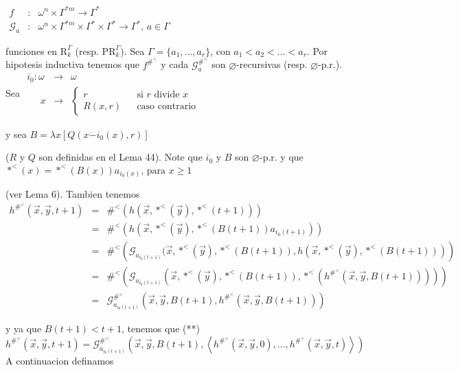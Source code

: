 \(\displaystyle \begin{array}{rcl} f & :& \omega ^{n}\times \Gamma ^{\ast m}\rightarrow \Gamma ^{\ast } \\ \mathcal{G}_{a} & :& \omega ^{n}\times \Gamma ^{\ast m}\times \Gamma ^{\ast }\times \Gamma ^{\ast }\rightarrow \Gamma ^{\ast }\text{, }a\in \Gamma \end{array} \)

funciones en \(\mathrm{R}_{k}^{\Gamma }\) (resp. \(\mathrm{PR}_{k}^{\Gamma }\)). Sea \(\Gamma =\{a_{1},...,a_{r}\}\), con \(a_{1}< a_{2}< ...< a_{r}\). Por hipotesis inductiva tenemos que \(f^{\#^{< }}\) y cada \(\mathcal{G} _{a}^{\#^{< }} \) son \(\varnothing \)-recursivas (resp. \(\varnothing \)-p.r.). Sea
\(\displaystyle \begin{array}{lll} i_{0}:\omega & \rightarrow & \omega \\ \;\;\;\;\;x & \rightarrow & \left\{ \begin{array}{lll} r & & \text{si }r\text{ divide }x \\ R(x,r) & & \text{caso contrario} \end{array} \right. \end{array} \)

y sea
\(\displaystyle B=\lambda x\left[ Q(x\dot{-}i_{0}(x),r)\right] \)

(\(R\) y \(Q\) son definidas en el Lema 44). Note que \(i_{0}\) y \(B\) son \(\varnothing \)-p.r. y que
\(\displaystyle \ast ^{< }(x)=\ast ^{< }(B(x))a_{i_{0}(x)}\text{, para }x\geq 1 \)

(ver Lema 6). Tambien tenemos
\(\displaystyle \begin{array}{rcl} h^{\#^{< }}(\vec{x},\vec{y},t+1) & =& \#^{< }(h(\vec{x},\ast ^{< }(\vec{y}),\ast ^{< }(t+1))) \\ & =& \#^{< }(h(\vec{x},\ast ^{< }(\vec{y}),\ast ^{< }(B(t+1))a_{i_{0}(t+1)})) \\ & =& \#^{< }\left( \mathcal{G}_{a_{i_{0}(t+1)}}(\vec{x},\ast ^{< }(\vec{y}),\ast ^{< }(B(t+1)),h(\vec{x},\ast ^{< }(\vec{y}),\ast ^{< }(B(t+1)))\right) \\ & =& \#^{< }\left( \mathcal{G}_{a_{i_{0}(t+1)}}(\vec{x},\ast ^{< }(\vec{y}),\ast ^{< }(B(t+1)),\ast ^{< }(h^{\#^{< }}(\vec{x},\vec{y},B(t+1))))\right) \\ & =& \mathcal{G}_{a_{i_{0}(t+1)}}^{\#^{< }}(\vec{x},\vec{y},B(t+1),h^{\#^{< }}( \vec{x},\vec{y},B(t+1))) \end{array} \)

y ya que \(B(t+1)< t+1\), tenemos que
(**) \(h^{\#^{< }}(\vec{x},\vec{y},t+1)=\mathcal{G}_{a_{i_{0}(t+1)}}^{ \#^{< }}(\vec{x},\vec{y},B(t+1),\left\langle h^{\#^{< }}(\vec{x},\vec{y} ,0),...,h^{\#^{< }}(\vec{x},\vec{y},t)\right\rangle )\)
A continuacion definamos

